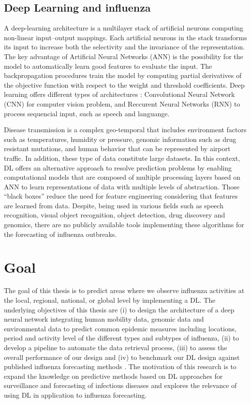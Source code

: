 \documentclass[12pt]{article}
\begin{document}
\subsection{Deep Learning and influenza}
A deep-learning architecture is a multilayer stack of artificial neurons computing non-linear input–output mappings. Each artificial neurons in the stack transforms its input to increase both the selectivity and the invariance of the representation\autocite{leCun2015}. The key advantage of Artificial Neural Networks (ANN) is the possibility for the model to automatically learn good features to evaluate the input. The backpropagation procedures train the model by computing partial derivatives of the objective function with respect to the weight and threshold coefficients. Deep learning offers different types of architectures : Convolutional Neural Network (CNN) for computer vision problem, and Reccurent Neural Networks (RNN) to process sequencial input, such as speech and languange\autocite{leCun2015, Miotto2017}. 
 
 Disease transmission is a complex geo-temporal that includes environment factors\autocite{Pica2012} such as temperatures, humidity or pressure, genomic information such as drug resistant mutations, and human behavior that can be represented by airport traffic. In addition, these type of data constitute large datasets. In this context, DL offers an alternative approach to resolve prediction problems by enabling computational models that are composed of multiple processing layers based on ANN to learn representations of data with multiple levels of abstraction. Those ``black boxes'' reduce the need for feature engineering considering that features are learned from data. Despite, being used in various fields such as speech recognition, visual object recognition, object detection, drug discovery and genomics, there are no publicly available tools implementing these algorithms for the forecasting of influenza outbreaks.

\section{Goal}

The goal of this thesis is to predict areas where we observe influenza activities at the local, regional, national, or global level by implementing a DL. The underlying objectives of this thesis are (i) to design the architecture of a deep neural network integrating human mobility data, genomic data and environmental data to predict common epidemic measures \autocite{nsoesie2014} including locations,  period and activity level of the different types and subtypes of influenza,  (ii) to develop a pipeline to automate the data retrieval process, (iii) to assess the overall performance of our design and (iv) to benchmark our DL design against published influenza forecasting methods . The motivation of this research is to expand the knowledge on predictive methods based on DL approaches for surveillance and forecasting of infectious diseases and explores the relevance of using DL in application to influenza forecasting. 
\end{document}
